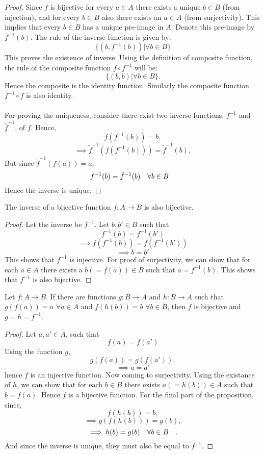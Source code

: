 \begin{proof}
  Since $f$ is bijective for every $a\in A$ there exists a unique $b\in B$ (from injection), and for every $b\in B$ also there exists an $a\in A$ (from surjectivity). This implies that every $b\in B$ has a unique pre-image in $A$. Denote this pre-image by $f^{-1}(b)$. The rule of the inverse function is given by:
  \[\{(b, f^{-1}(b))|\forall b \in B\}\]
  This proves the existence of inverse. Using the definition of composite function, the rule of the composite function $f\circ f^{-1}$ will be:
  \[\{(b,b)|\forall b\in B\}.\]
  Hence the composite is the identity function. Similarly the composite function $f^{-1}\circ f$ is also identity.
  \paragraph{} For proving the uniqueness, consider there exist two inverse functions, $f^{-1}$ and $\tilde{f}^{-1}$, of $f$. Hence,
  \[f(f^{-1}(b)) = b,\]
  \[\implies \tilde{f}^{-1}(f(f^{-1}(b))) = \tilde{f}^{-1}(b),\]
  But since $\tilde{f}^{-1}(f(a)) = a$,
  \[f^{-1}(b) = \tilde{f}^{-1}(b) \qq{$\forall b\in B$}\]
Hence the inverse is unique.
\end{proof}
\begin{proposition}
  The inverse of a bijective function $f:A\to B$ is also bijective.
\end{proposition}
\begin{proof}
  Let the inverse be $f^{-1}$. Let $b,b'\in B$ such that
  \[f^{-1}(b) = f^{-1}(b')\]
  \[\implies f(f^{-1}(b)) = f(f^{-1}(b'))\]
  \[\implies b = b'\]
  This shows that $f^{-1}$ is injective. For proof of surjectivity, we can show that for each $a\in A$ there exists a $b(=f(a))\in B$ such that $a = f^{-1}(b)$. This shows that $f^{-1}$ is also bijective.
\end{proof}
\begin{proposition}
  Let $f:A\to B$. If there are functions $g:B\to A$ and $h:B\to A$ such that $g(f(a))=a$ $\forall a \in A$ and $f(h(b)) = b$ $\forall b\in B$, then $f$ is bijective and $g=h=f^{-1}$. 
  \label{pro:2.2}
\end{proposition}
\begin{proof}
  Let $a,a'\in A$, such that
  \[f(a) = f(a')\]
  Using the function $g$,
  \[g(f(a)) = g(f(a')),\]
  \[\implies a = a'\]
  hence $f$ is an injective function. Now coming to surjectivity. Using the existance of $h$, we can show that for each $b\in B$ there exists $a (= h(b))\in A$ such that $b = f(a)$. Hence $f$ is a bijective function. For the final part of the proposition, since,
  \[f(h(b)) = b,\]
  \[\implies g(f(h(b))) = g(b),\]
  \[\implies h(b) = g(b) \qq{$\forall b\in B$}.\]
  And since the inverse is unique, they must also be equal to $f^{-1}$.
\end{proof}
